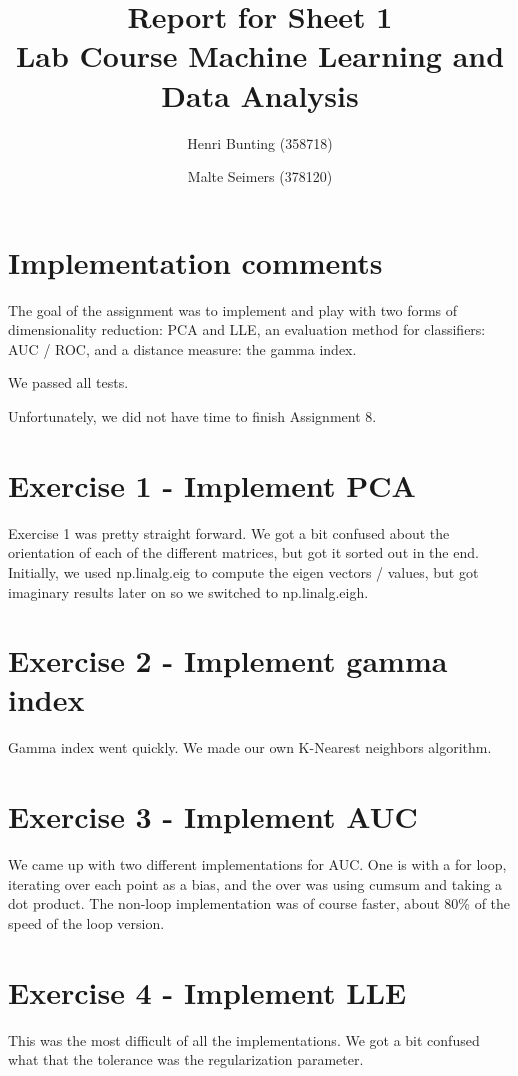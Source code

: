 \documentclass[a4paper,11pt]{article}
\begin{document}
\author{Henri Bunting (358718) \and Malte Seimers (378120)}
\title{\vspace{-2cm}Report for Sheet 1\\
\small{Lab Course Machine Learning and Data Analysis}}
\maketitle

\section*{Implementation comments}
The goal of the assignment was to implement and play with two forms of dimensionality reduction: PCA and LLE, an evaluation method for classifiers: AUC / ROC, and a distance measure: the gamma index.

We passed all tests.

Unfortunately, we did not have time to finish Assignment 8.

\section*{Exercise 1 - Implement PCA}
Exercise 1 was pretty straight forward.  We got a bit confused about the orientation of each of the different matrices, but got it sorted out in the end.  Initially, we used np.linalg.eig to compute the eigen vectors / values, but got imaginary results later on so we switched to np.linalg.eigh.  

\section*{Exercise 2 - Implement gamma index}
Gamma index went quickly.  We made our own K-Nearest neighbors algorithm.

\section*{Exercise 3 - Implement AUC}
We came up with two different implementations for AUC.  One is with a for loop, iterating over each point as a bias, and the over was using cumsum and taking a dot product.  The non-loop implementation was of course faster, about 80\% of the speed of the loop version.

\section*{Exercise 4 - Implement LLE}
This was the most difficult of all the implementations.  We got a bit confused what that the tolerance was the regularization parameter.
\clearpage
\end{document}
